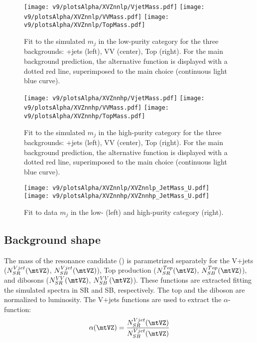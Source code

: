 
\begin{figure}[!htb]
  \centering
    \texttt{[image: v9/plotsAlpha/XVZnnlp/VjetMass.pdf]}
    \texttt{[image: v9/plotsAlpha/XVZnnlp/VVMass.pdf]}
    \texttt{[image: v9/plotsAlpha/XVZnnlp/TopMass.pdf]}
  \caption{Fit to the simulated $m_j$ in the low-purity category for the three backgrounds: \V+jets (left), VV (center), Top (right). For the main background prediction, the alternative function is displayed with a dotted red line, superimposed to the main choice (continuous light blue curve).}
  \label{fig:XVZnnlp_JetMass}
\end{figure}


\begin{figure}[!htb]
  \centering
    \texttt{[image: v9/plotsAlpha/XVZnnhp/VjetMass.pdf]}
    \texttt{[image: v9/plotsAlpha/XVZnnhp/VVMass.pdf]}
    \texttt{[image: v9/plotsAlpha/XVZnnhp/TopMass.pdf]}
  \caption{Fit to the simulated $m_j$ in the high-purity category for the three backgrounds: \V+jets (left), VV (center), Top (right). For the main background prediction, the alternative function is displayed with a dotted red line, superimposed to the main choice (continuous light blue curve).}
  \label{fig:XVZnnhp_JetMass}
\end{figure}


\begin{figure}[!htb]
  \centering
    \texttt{[image: v9/plotsAlpha/XVZnnlp/XVZnnlp\_JetMass\_U.pdf]}
    \texttt{[image: v9/plotsAlpha/XVZnnhp/XVZnnhp\_JetMass\_U.pdf]}
  \caption{Fit to data $m_j$ in the low- (left) and high-purity category (right).}
  \label{fig:XVZnn_JetMass}
\end{figure}




\clearpage




\subsection{Background shape}\label{ssec:alphaShape}

The mass of the resonance candidate (\mtVZ) is parametrized separately for the V+jets ($N_{SR}^{Vjet}(\mtVZ)$, $N_{SB}^{Vjet}(\mtVZ)$), Top production  ($N_{SR}^{Top}(\mtVZ)$, $N_{SB}^{Top}(\mtVZ)$), and dibosons ($N_{SR}^{VV}(\mtVZ)$, $N_{SB}^{VV}(\mtVZ)$). These functions are extracted fitting the simulated \mtVZ spectra in SR and SB, respectively. The top and the diboson are normalized to luminosity. The V+jets functions are used to extract the $\alpha$-function: $$\alpha(\mtVZ) = \frac{N_{SR}^{Vjet}(\mtVZ)}{N_{SB}^{Vjet}(\mtVZ)}$$


